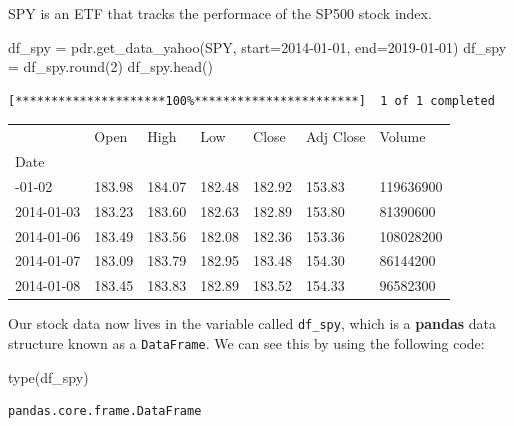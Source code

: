 \documentclass[
  letterpaper,
  DIV=11,
  numbers=noendperiod]{scrreprt}
\newenvironment{Shaded}{\begin{snugshade}}{\end{snugshade}}
\newcommand{\BuiltInTok}[1]{\textcolor[rgb]{0.00,0.23,0.31}{#1}}
\newcommand{\DecValTok}[1]{\textcolor[rgb]{0.68,0.00,0.00}{#1}}
\newcommand{\NormalTok}[1]{\textcolor[rgb]{0.00,0.23,0.31}{#1}}
\newcommand{\OperatorTok}[1]{\textcolor[rgb]{0.37,0.37,0.37}{#1}}
\newcommand{\StringTok}[1]{\textcolor[rgb]{0.13,0.47,0.30}{#1}}
\begin{document}
SPY is an ETF that tracks the performace of the SP500 stock index.

\begin{Shaded}
\begin{Highlighting}[]
\NormalTok{df\_spy }\OperatorTok{=}\NormalTok{ pdr.get\_data\_yahoo(}\StringTok{\textquotesingle{}SPY\textquotesingle{}}\NormalTok{, start}\OperatorTok{=}\StringTok{\textquotesingle{}2014{-}01{-}01\textquotesingle{}}\NormalTok{, end}\OperatorTok{=}\StringTok{\textquotesingle{}2019{-}01{-}01\textquotesingle{}}\NormalTok{)}
\NormalTok{df\_spy }\OperatorTok{=}\NormalTok{ df\_spy.}\BuiltInTok{round}\NormalTok{(}\DecValTok{2}\NormalTok{)}
\NormalTok{df\_spy.head()}
\end{Highlighting}
\end{Shaded}

\begin{verbatim}
[*********************100%***********************]  1 of 1 completed
\end{verbatim}

\begin{longtable}[]{@{}lllllll@{}}
\toprule\noalign{}
& Open & High & Low & Close & Adj Close & Volume \\
Date & & & & & & \\
\midrule\noalign{}
\endhead
\bottomrule\noalign{}
\endlastfoot
2014-01-02 & 183.98 & 184.07 & 182.48 & 182.92 & 153.83 & 119636900 \\
2014-01-03 & 183.23 & 183.60 & 182.63 & 182.89 & 153.80 & 81390600 \\
2014-01-06 & 183.49 & 183.56 & 182.08 & 182.36 & 153.36 & 108028200 \\
2014-01-07 & 183.09 & 183.79 & 182.95 & 183.48 & 154.30 & 86144200 \\
2014-01-08 & 183.45 & 183.83 & 182.89 & 183.52 & 154.33 & 96582300 \\
\end{longtable}

Our stock data now lives in the variable called \texttt{df\_spy}, which
is a \textbf{pandas} data structure known as a \texttt{DataFrame}. We
can see this by using the following code:

\begin{Shaded}
\begin{Highlighting}[]
\BuiltInTok{type}\NormalTok{(df\_spy)}
\end{Highlighting}
\end{Shaded}

\begin{verbatim}
pandas.core.frame.DataFrame
\end{verbatim}
\end{document}
